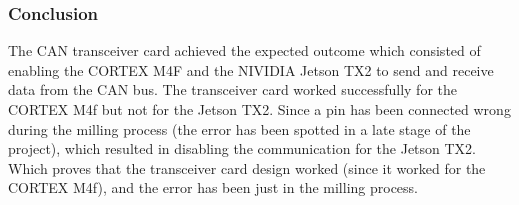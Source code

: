 \subsubsection{Conclusion}
The CAN transceiver card achieved the expected outcome which consisted of enabling the CORTEX M4F and the NIVIDIA Jetson TX2 to send and receive data from the CAN bus. The transceiver card worked successfully for the CORTEX M4f  but not for the Jetson TX2. Since a pin has been connected wrong during the milling process (the error has been spotted in a late stage of the project), which resulted in disabling the communication for the Jetson TX2. Which proves that the transceiver card design worked (since it worked for the CORTEX M4f), and the error has been just in the milling process.


